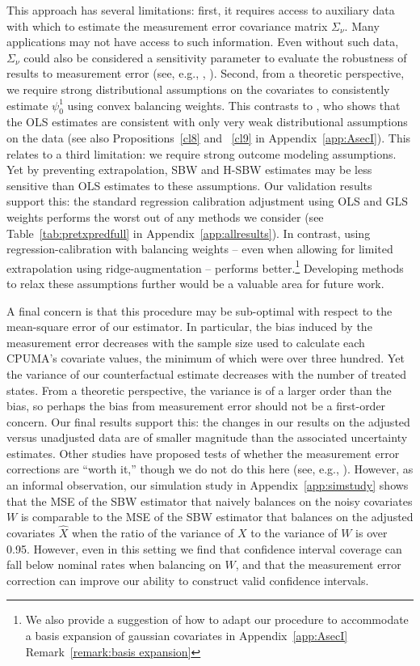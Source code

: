 \documentclass[aoas]{imsart}
\theoremstyle{plain}
\theoremstyle{remark}
\begin{document}
This approach has several limitations: first, it requires access to auxiliary data with which to estimate the measurement error covariance matrix $\Sigma_{\nu}$. Many applications may not have access to such information. Even without such data, $\Sigma_{\nu}$ could also be considered a sensitivity parameter to evaluate the robustness of results to measurement error (see, e.g., \cite{huque2014impact}, \cite{illenberger2020impact}). Second, from a theoretic perspective, we require strong distributional assumptions on the covariates to consistently estimate $\psi_0^1$ using convex balancing weights. This contrasts to \cite{gleser1992importance}, who shows that the OLS estimates are consistent with only very weak distributional assumptions on the data (see also Propositions~\ref{cl8} and ~\ref{cl9} in Appendix~\ref{app:AsecI}). This relates to a third limitation: we require strong outcome modeling assumptions. Yet by preventing extrapolation, SBW and H-SBW estimates may be less sensitive than OLS estimates to these assumptions. Our validation results support this: the standard regression calibration adjustment using OLS and GLS weights performs the worst out of any methods we consider (see Table~\ref{tab:pretxpredfull} in Appendix~\ref{app:allresults}). In contrast, using regression-calibration with balancing weights -- even when allowing for limited extrapolation using ridge-augmentation -- performs better.\footnote{We also provide a suggestion of how to adapt our procedure to accommodate a basis expansion of gaussian covariates in Appendix~\ref{app:AsecI} Remark~\ref{remark:basis expansion}} Developing methods to relax these assumptions further would be a valuable area for future work.

A final concern is that this procedure may be sub-optimal with respect to the mean-square error of our estimator. In particular, the bias induced by the measurement error decreases with the sample size used to calculate each CPUMA's covariate values, the minimum of which were over three hundred. Yet the variance of our counterfactual estimate decreases with the number of treated states. From a theoretic perspective, the variance is of a larger order than the bias, so perhaps the bias from measurement error should not be a first-order concern. Our final results support this: the changes in our results on the adjusted versus unadjusted data are of smaller magnitude than the associated uncertainty estimates. Other studies have proposed tests of whether the measurement error corrections are ``worth it,'' though we do not do this here (see, e.g., \cite{gleser1992importance}). However, as an informal observation, our simulation study in Appendix~\ref{app:simstudy} shows that the MSE of the SBW estimator that naively balances on the noisy covariates $W$ is comparable to the MSE of the SBW estimator that balances on the adjusted covariates $\hat{X}$ when the ratio of the variance of $X$ to the variance of $W$ is over 0.95. However, even in this setting we find that confidence interval coverage can fall below nominal rates when balancing on $W$, and that the measurement error correction can improve our ability to construct valid confidence intervals.
\end{document}

